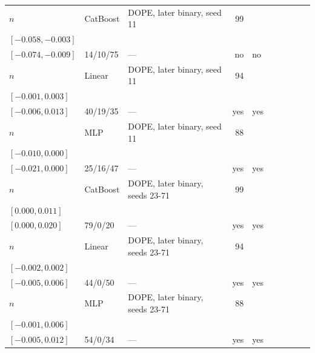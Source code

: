 \begin{longtable}{@{}ll>{\raggedright\arraybackslash}p{1.1in}rllrlll@{}}
$n$ & CatBoost & DOPE, later binary, seed 11 & 99 & \begin{tabular}[t]{@{}l@{}}$-0.020$\\\tiny$[-0.058, -0.003]$\end{tabular} & \begin{tabular}[t]{@{}l@{}}$-0.033$\\\tiny$[-0.074, -0.009]$\end{tabular} & 14/10/75 & --- & no & no \\
$n$ & Linear & DOPE, later binary, seed 11 & 94 & \begin{tabular}[t]{@{}l@{}}$0.000$\\\tiny$[-0.001, 0.003]$\end{tabular} & \begin{tabular}[t]{@{}l@{}}$0.002$\\\tiny$[-0.006, 0.013]$\end{tabular} & 40/19/35 & --- & yes & yes \\
$n$ & MLP & DOPE, later binary, seed 11 & 88 & \begin{tabular}[t]{@{}l@{}}$-0.003$\\\tiny$[-0.010, 0.000]$\end{tabular} & \begin{tabular}[t]{@{}l@{}}$-0.007$\\\tiny$[-0.021, 0.000]$\end{tabular} & 25/16/47 & --- & yes & yes \\
$n$ & CatBoost & DOPE, later binary, seeds 23-71 & 99 & \begin{tabular}[t]{@{}l@{}}$0.008$\\\tiny$[0.000, 0.011]$\end{tabular} & \begin{tabular}[t]{@{}l@{}}$0.010$\\\tiny$[0.000, 0.020]$\end{tabular} & 79/0/20 & --- & yes & yes \\
$n$ & Linear & DOPE, later binary, seeds 23-71 & 94 & \begin{tabular}[t]{@{}l@{}}$0.000$\\\tiny$[-0.002, 0.002]$\end{tabular} & \begin{tabular}[t]{@{}l@{}}$0.000$\\\tiny$[-0.005, 0.006]$\end{tabular} & 44/0/50 & --- & yes & yes \\
$n$ & MLP & DOPE, later binary, seeds 23-71 & 88 & \begin{tabular}[t]{@{}l@{}}$0.003$\\\tiny$[-0.001, 0.006]$\end{tabular} & \begin{tabular}[t]{@{}l@{}}$0.003$\\\tiny$[-0.005, 0.012]$\end{tabular} & 54/0/34 & --- & yes & yes \\

\end{longtable}
